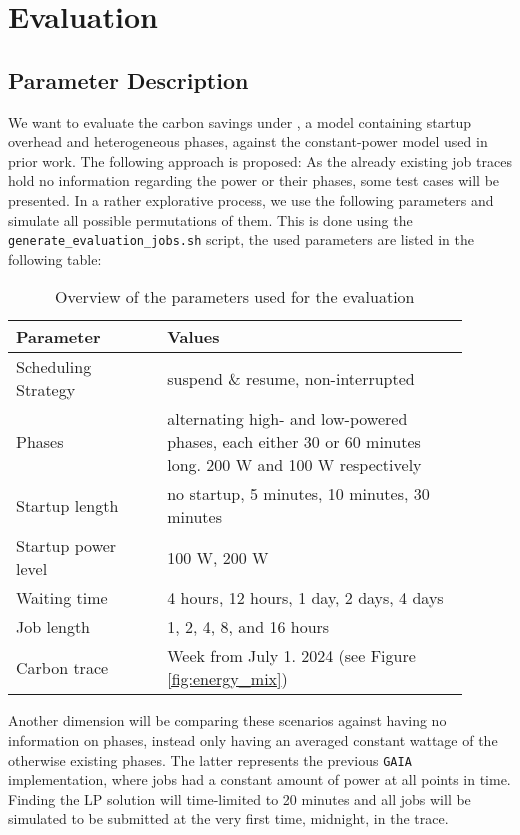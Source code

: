 \chapter{Evaluation} \label{sec:evaluate_scheduling}

\section{Parameter Description}

We want to evaluate the carbon savings under \modelname{}, a model containing startup overhead and heterogeneous phases, against the constant-power model used in prior work.
The following approach is proposed:
As the already existing job traces hold no information regarding the power or their phases, some test cases will be presented.
In a rather explorative process, we use the following parameters and simulate all possible permutations of them. 
This is done using the \verb|generate_evaluation_jobs.sh| script, the used parameters are listed in the following table:

\begin{table}[h!]
    \centering
    \begin{tabular}{|p{0.3\linewidth}|p{0.6\linewidth}|}
    \hline
        Parameter & Values \\ \hline
        Scheduling Strategy & suspend \& resume, non-interrupted \\ \hline
        Phases & alternating high- and low-powered phases, each either 30 or 60 minutes long. 200 W and 100 W respectively \\ \hline
        Startup length & no startup, 5 minutes, 10 minutes, 30 minutes \\ \hline
        Startup power level & 100 W, 200 W \\ \hline
        Waiting time & 4 hours, 12 hours, 1 day, 2 days, 4 days \\ \hline
        Job length & 1, 2, 4, 8, and 16 hours \\ \hline
        Carbon trace & Week from July 1. 2024 (see Figure \ref{fig:energy_mix}) \\ \hline
    \end{tabular}
    \caption{Overview of the parameters used for the evaluation}
    \label{tab:evaluation_parameters}
    \end{table}

Another dimension will be comparing these scenarios against having no information on phases, instead only having an averaged constant wattage of the otherwise existing phases.
The latter represents the previous \verb|GAIA| implementation, where jobs had a constant amount of power at all points in time.
Finding the LP solution will time-limited to 20 minutes and all jobs will be simulated to be submitted at the very first time, midnight, in the trace.

